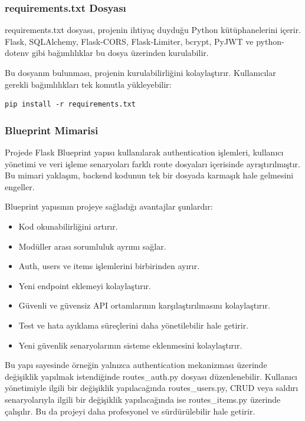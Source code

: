 \subsubsection{requirements.txt Dosyası}

requirements.txt dosyası, projenin ihtiyaç duyduğu Python kütüphanelerini içerir. Flask, SQLAlchemy, Flask-CORS, Flask-Limiter, bcrypt, PyJWT ve python-dotenv gibi bağımlılıklar bu dosya üzerinden kurulabilir.

Bu dosyanın bulunması, projenin kurulabilirliğini kolaylaştırır. Kullanıcılar gerekli bağımlılıkları tek komutla yükleyebilir:

\begin{lstlisting}
pip install -r requirements.txt
\end{lstlisting}

\subsubsection{Blueprint Mimarisi}

Projede Flask Blueprint yapısı kullanılarak authentication işlemleri, kullanıcı yönetimi ve veri işleme senaryoları farklı route dosyaları içerisinde ayrıştırılmıştır. Bu mimari yaklaşım, backend kodunun tek bir dosyada karmaşık hale gelmesini engeller.

Blueprint yapısının projeye sağladığı avantajlar şunlardır:

\begin{itemize}[leftmargin=*]
    \item Kod okunabilirliğini artırır.
    \item Modüller arası sorumluluk ayrımı sağlar.
    \item Auth, users ve items işlemlerini birbirinden ayırır.
    \item Yeni endpoint eklemeyi kolaylaştırır.
    \item Güvenli ve güvensiz API ortamlarının karşılaştırılmasını kolaylaştırır.
    \item Test ve hata ayıklama süreçlerini daha yönetilebilir hale getirir.
    \item Yeni güvenlik senaryolarının sisteme eklenmesini kolaylaştırır.
\end{itemize}

Bu yapı sayesinde örneğin yalnızca authentication mekanizması üzerinde değişiklik yapılmak istendiğinde routes\_auth.py dosyası düzenlenebilir. Kullanıcı yönetimiyle ilgili bir değişiklik yapılacağında routes\_users.py, CRUD veya saldırı senaryolarıyla ilgili bir değişiklik yapılacağında ise routes\_items.py üzerinde çalışılır. Bu da projeyi daha profesyonel ve sürdürülebilir hale getirir.

